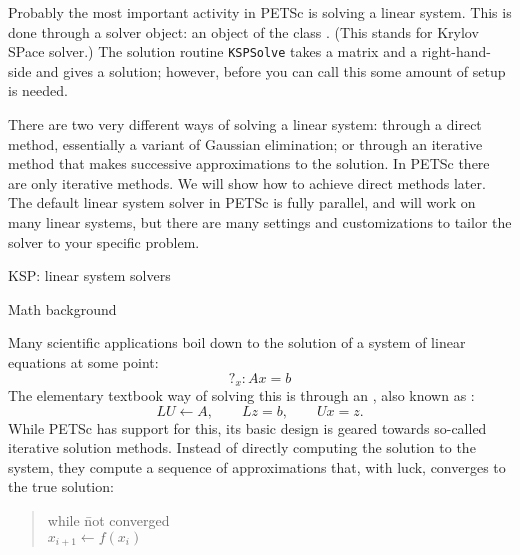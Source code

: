 
Probably the most important activity in PETSc is solving a linear
system. This is done through a solver object: an object of the class
. (This stands for Krylov SPace solver.) The solution routine
\lstinline{KSPSolve} takes a matrix and a right-hand-side and gives a
solution; however, before you can call this some amount of setup is needed.

There are two very different ways of solving a
linear system: through a direct method, essentially a variant of
Gaussian elimination; or through an iterative method that makes
successive approximations to the solution. In PETSc there are only
iterative methods. We will show how to achieve direct methods later.
The default linear system solver in PETSc is fully parallel, and will
work on many linear systems, but there are many settings and
customizations to tailor the solver to your specific problem.

 {KSP: linear system solvers}
\label{sec:petsc-ksp}

 {Math background}
\label{sec:petsc-math}

Many scientific applications boil down to the solution of a system of
linear equations at some point:
\[ ?_x\colon Ax=b \]
The elementary textbook way of solving this is through an
,
also known as :
\[ LU\leftarrow A,\qquad Lz=b,\qquad Ux=z. \]
While PETSc has support for this, its basic design is geared towards
so-called iterative solution methods.
Instead of directly computing
the solution to the system, they compute a sequence of approximations
that, with luck, converges to the true solution:

\begin{quote}
  \begin{tabbing}
    while \=not converged\\
    \> $x_{i+1}\leftarrow f(x_i)$
  \end{tabbing}
\end{quote}

